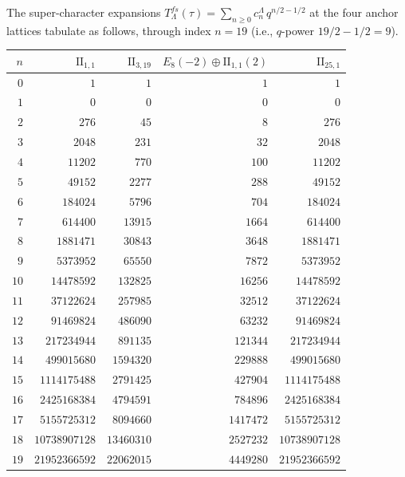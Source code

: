 \begin{remark}
\label{rem:bkm-anchor-fourier-table}
The super-character expansions
$T^{fs}_\Lambda(\tau) = \sum_{n\geq 0} c^\Lambda_n\, q^{n/2 - 1/2}$ at
the four anchor lattices tabulate as follows, through index $n=19$
(i.e., $q$-power $19/2 - 1/2 = 9$).
\begin{center}
\footnotesize
\renewcommand{\arraystretch}{1.08}
\begin{tabular}{r|rrrr}
\toprule
$n$ & $\mathrm{II}_{1,1}$ & $\mathrm{II}_{3,19}$ &
$E_8(-2){\oplus}\mathrm{II}_{1,1}(2)$ & $\mathrm{II}_{25,1}$ \\
\midrule
$0$ & $1$ & $1$ & $1$ & $1$ \\
$1$ & $0$ & $0$ & $0$ & $0$ \\
$2$ & $276$ & $45$ & $8$ & $276$ \\
$3$ & $2048$ & $231$ & $32$ & $2048$ \\
$4$ & $11202$ & $770$ & $100$ & $11202$ \\
$5$ & $49152$ & $2277$ & $288$ & $49152$ \\
$6$ & $184024$ & $5796$ & $704$ & $184024$ \\
$7$ & $614400$ & $13915$ & $1664$ & $614400$ \\
$8$ & $1881471$ & $30843$ & $3648$ & $1881471$ \\
$9$ & $5373952$ & $65550$ & $7872$ & $5373952$ \\
$10$ & $14478592$ & $132825$ & $16256$ & $14478592$ \\
$11$ & $37122624$ & $257985$ & $32512$ & $37122624$ \\
$12$ & $91469824$ & $486090$ & $63232$ & $91469824$ \\
$13$ & $217234944$ & $891135$ & $121344$ & $217234944$ \\
$14$ & $499015680$ & $1594320$ & $229888$ & $499015680$ \\
$15$ & $1114175488$ & $2791425$ & $427904$ & $1114175488$ \\
$16$ & $2425168384$ & $4794591$ & $784896$ & $2425168384$ \\
$17$ & $5155725312$ & $8094660$ & $1417472$ & $5155725312$ \\
$18$ & $10738907128$ & $13460310$ & $2527232$ & $10738907128$ \\
$19$ & $21952366592$ & $22062015$ & $4449280$ & $21952366592$ \\
\bottomrule
\end{tabular}

\end{center}
\end{remark}
